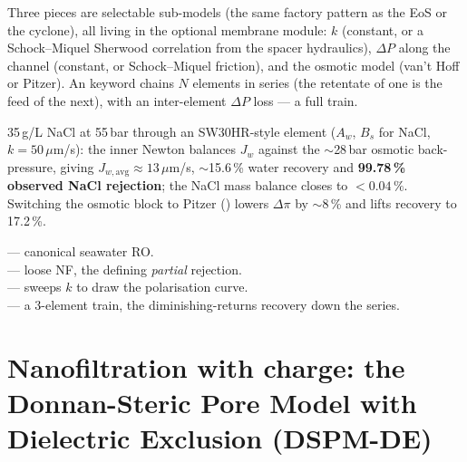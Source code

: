 \documentclass[11pt,a4paper]{article}
\begin{document}
Three pieces are selectable sub-models (the same factory pattern as the
EoS or the cyclone), all living in the optional membrane module:
$k$ (constant, or a Schock--Miquel Sherwood correlation from the spacer
hydraulics), $\Delta P$ along the channel (constant, or Schock--Miquel
friction), and the osmotic model (van't Hoff or Pitzer).  An
 keyword chains $N$ elements in series (the retentate
of one is the feed of the next), with an inter-element $\Delta P$ loss
--- a full train.

\begin{example}
35\,g/L NaCl at 55\,bar through an SW30HR-style element ($A_w$, $B_s$
for NaCl, $k=50\,\mu$m/s): the inner Newton balances $J_w$ against the
$\sim$28\,bar osmotic back-pressure, giving $J_{w,\text{avg}}\approx
13\,\mu$m/s, $\sim$15.6\,\% water recovery and \textbf{99.78\,\%
observed NaCl rejection}; the NaCl mass balance closes to $<0.04\,\%$.
Switching the osmotic block to Pitzer ()
lowers $\Delta\pi$ by $\sim$8\,\% and lifts recovery to 17.2\,\%.
\end{example}

\begin{tutoriallink}
 --- canonical
seawater RO. \\
 --- loose NF, the
defining \emph{partial} rejection. \\
 ---
sweeps $k$ to draw the polarisation curve. \\
 --- a 3-element train, the
diminishing-returns recovery down the series.
\end{tutoriallink}

\section{Nanofiltration with charge: the Donnan-Steric Pore Model with
Dielectric Exclusion (DSPM-DE)}\label{ch:dspmde}
\end{document}
